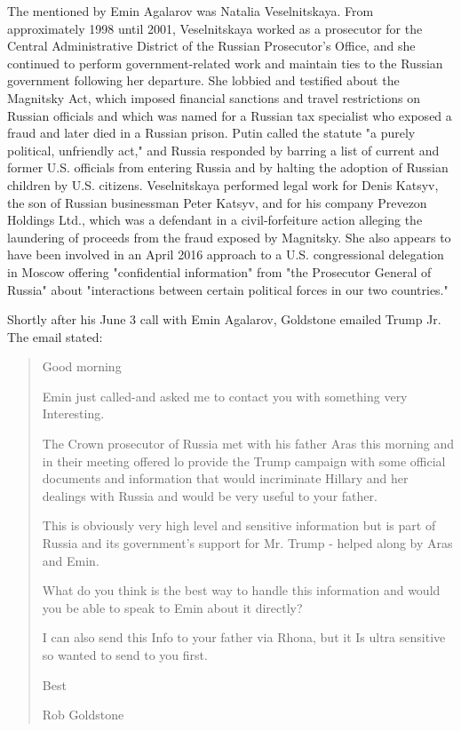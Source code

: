 The  mentioned by Emin Agalarov was Natalia Veselnitskaya.
From approximately 1998 until 2001, Veselnitskaya worked as a prosecutor for the Central Administrative District of the Russian Prosecutor's Office,%
and she continued to perform government-related work and maintain ties to the Russian government following her departure.%
She lobbied and testified about the Magnitsky Act, which imposed financial sanctions and travel restrictions on Russian officials and which was named for a Russian tax specialist who exposed a fraud and later died in a Russian prison.%
Putin called the statute "a purely political, unfriendly act," and Russia responded by barring a list of current and former U.S. officials from entering Russia and by halting the adoption of Russian children by U.S. citizens.%
Veselnitskaya performed legal work for Denis Katsyv,%
the son of Russian businessman Peter Katsyv, and for his company Prevezon Holdings Ltd., which was a defendant in a civil-forfeiture action alleging the laundering of proceeds from the fraud exposed by Magnitsky.%
She also appears to have been involved in an April 2016 approach to a U.S. congressional delegation in Moscow offering "confidential information" from "the Prosecutor General of Russia" about "interactions between certain political forces in our two countries."%

Shortly after his June 3 call with Emin Agalarov, Goldstone emailed Trump Jr.%
The email stated:

\begin{quote}
Good morning

Emin just called-and asked me to contact you with something very Interesting.

The Crown prosecutor of Russia met with his father Aras this morning and in their meeting offered lo provide the Trump campaign with some official documents and information that would incriminate Hillary and her dealings with Russia and would be very useful to your father.

This is obviously very high level and sensitive information but is part of Russia and its government's support for Mr. Trump - helped along by Aras and Emin.

What do you think is the best way to handle this information and would you be able to speak to Emin about it directly?

I can also send this Info to your father via Rhona, but it Is ultra sensitive so wanted to send to you first.

Best

Rob Goldstone
\end{quote}


